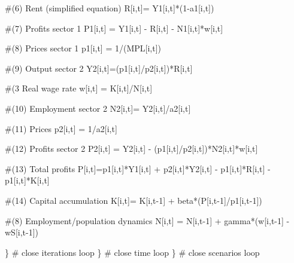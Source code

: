 \documentclass[
  letterpaper,
  DIV=11,
  numbers=noendperiod]{scrreprt}
\newenvironment{Shaded}{\begin{snugshade}}{\end{snugshade}}
\newcommand{\CommentTok}[1]{\textcolor[rgb]{0.37,0.37,0.37}{#1}}
\newcommand{\DecValTok}[1]{\textcolor[rgb]{0.68,0.00,0.00}{#1}}
\newcommand{\NormalTok}[1]{\textcolor[rgb]{0.00,0.23,0.31}{#1}}
\newcommand{\OtherTok}[1]{\textcolor[rgb]{0.00,0.23,0.31}{#1}}
\newcommand{\SpecialCharTok}[1]{\textcolor[rgb]{0.37,0.37,0.37}{#1}}
\begin{document}
\begin{Shaded}
\begin{Highlighting}[]
      \CommentTok{\#(6) Rent (simplified equation)}
\NormalTok{      R[i,t]}\OtherTok{=}\NormalTok{ Y1[i,t]}\SpecialCharTok{*}\NormalTok{(}\DecValTok{1}\SpecialCharTok{{-}}\NormalTok{a1[i,t]) }
      
      \CommentTok{\#(7) Profits sector 1}
\NormalTok{      P1[i,t] }\OtherTok{=}\NormalTok{ Y1[i,t] }\SpecialCharTok{{-}}\NormalTok{ R[i,t] }\SpecialCharTok{{-}}\NormalTok{ N1[i,t]}\SpecialCharTok{*}\NormalTok{w[i,t]}

      \CommentTok{\#(8) Prices sector 1}
\NormalTok{      p1[i,t] }\OtherTok{=} \DecValTok{1}\SpecialCharTok{/}\NormalTok{(MPL[i,t])        }

      \CommentTok{\#(9) Output sector 2}
\NormalTok{      Y2[i,t]}\OtherTok{=}\NormalTok{(p1[i,t]}\SpecialCharTok{/}\NormalTok{p2[i,t])}\SpecialCharTok{*}\NormalTok{R[i,t]}
      
      \CommentTok{\#(3 Real wage rate}
\NormalTok{      w[i,t] }\OtherTok{=}\NormalTok{ K[i,t]}\SpecialCharTok{/}\NormalTok{N[i,t] }
      
      \CommentTok{\#(10) Employment sector 2}
\NormalTok{      N2[i,t]}\OtherTok{=}\NormalTok{ Y2[i,t]}\SpecialCharTok{/}\NormalTok{a2[i,t]}

      \CommentTok{\#(11) Prices}
\NormalTok{      p2[i,t] }\OtherTok{=} \DecValTok{1}\SpecialCharTok{/}\NormalTok{a2[i,t]}

      \CommentTok{\#(12) Profits sector 2}
\NormalTok{      P2[i,t] }\OtherTok{=}\NormalTok{ Y2[i,t] }\SpecialCharTok{{-}}\NormalTok{ (p1[i,t]}\SpecialCharTok{/}\NormalTok{p2[i,t])}\SpecialCharTok{*}\NormalTok{N2[i,t]}\SpecialCharTok{*}\NormalTok{w[i,t]}

      \CommentTok{\#(13) Total profits}
\NormalTok{      P[i,t]}\OtherTok{=}\NormalTok{p1[i,t]}\SpecialCharTok{*}\NormalTok{Y1[i,t] }\SpecialCharTok{+}\NormalTok{ p2[i,t]}\SpecialCharTok{*}\NormalTok{Y2[i,t] }\SpecialCharTok{{-}}\NormalTok{ p1[i,t]}\SpecialCharTok{*}\NormalTok{R[i,t] }\SpecialCharTok{{-}}\NormalTok{ p1[i,t]}\SpecialCharTok{*}\NormalTok{K[i,t]}

      \CommentTok{\#(14) Capital accumulation}
\NormalTok{      K[i,t]}\OtherTok{=}\NormalTok{ K[i,t}\DecValTok{{-}1}\NormalTok{] }\SpecialCharTok{+}\NormalTok{ beta}\SpecialCharTok{*}\NormalTok{(P[i,t}\DecValTok{{-}1}\NormalTok{]}\SpecialCharTok{/}\NormalTok{p1[i,t}\DecValTok{{-}1}\NormalTok{])}
      
      \CommentTok{\#(8) Employment/population dynamics  }
\NormalTok{      N[i,t] }\OtherTok{=}\NormalTok{ N[i,t}\DecValTok{{-}1}\NormalTok{] }\SpecialCharTok{+}\NormalTok{ gamma}\SpecialCharTok{*}\NormalTok{(w[i,t}\DecValTok{{-}1}\NormalTok{] }\SpecialCharTok{{-}}\NormalTok{ wS[i,t}\DecValTok{{-}1}\NormalTok{])}
      
\NormalTok{    \} }\CommentTok{\# close iterations loop}
\NormalTok{  \} }\CommentTok{\# close time loop}
\NormalTok{\} }\CommentTok{\# close scenarios loop}
\end{Highlighting}
\end{Shaded}
\end{document}
